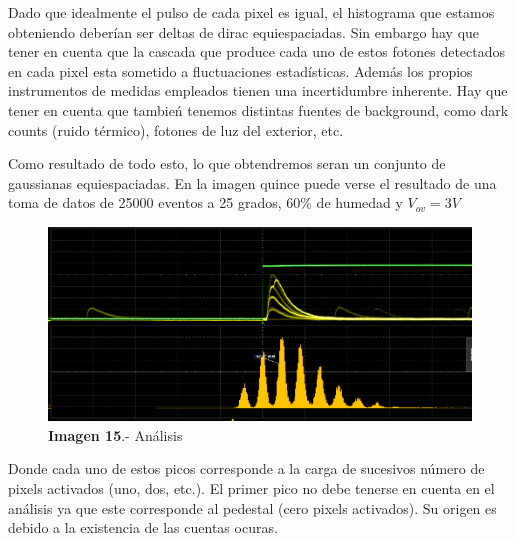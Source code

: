 Dado que idealmente el pulso de cada pixel es igual, el histograma que estamos obteniendo deberían ser deltas de dirac equiespaciadas. Sin embargo hay que tener en cuenta que la cascada que produce cada uno de estos fotones detectados en cada pixel esta sometido a fluctuaciones estadísticas. Además los propios instrumentos de medidas empleados tienen una incertidumbre inherente. Hay que tener en cuenta que tambień tenemos distintas fuentes de background, como dark counts (ruido térmico), fotones de luz del exterior, etc. 

Como resultado de todo esto, lo que obtendremos seran un conjunto de gaussianas equiespaciadas. En la imagen quince puede verse el resultado de una toma de datos de 25000 eventos a 25 grados, 60\% de humedad y $V_{ov}=3V$

\begin{figure}[hbtp]
 \centering
 \includegraphics[scale=0.2]{Analisis.png}
 \caption{\textbf{Imagen 15}.- Análisis}
 \end{figure}

Donde cada uno de estos picos corresponde a la carga de sucesivos número de pixels activados (uno, dos, etc.). El primer pico no debe tenerse en cuenta en el análisis ya que este corresponde al pedestal (cero pixels activados). Su origen es debido a la existencia de las cuentas ocuras.
 
